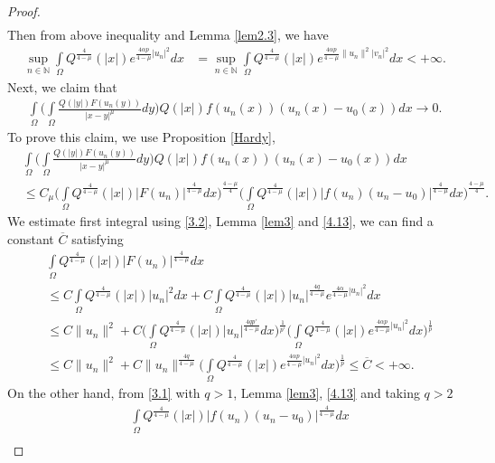 \documentclass[11pt]{amsart}
\numberwithin{equation}{section}
\newcommand{\1}{\frac{1}{2}}
\begin{document}
\begin{proof}
\begin{align}
		\end{align}
		Then from above inequality and Lemma \ref{lem2.3}, we have
		\begin{align}
			\label{4.13}
			\sup_{n \in \mathbb{N}} \int\limits_\Omega Q^{\frac{4}{4-\mu}}(|x|)e^{\frac{4\alpha p}{4-\mu}|u_n|^2}dx &= \sup_{n \in \mathbb{N}} \int\limits_\Omega Q^{\frac{4}{4-\mu}}(|x|)e^{\frac{4\alpha p}{4-\mu}\|u_n\|^2|v_n|^2}dx < +\infty. 
		\end{align}
		Next, we claim that 
		\begin{align}
			\label{4.14}\int\limits_\Omega \Bigg( \int\limits_\Omega \frac{Q(|y|)F(u_n(y))}{|x-y|^\mu}dy\Bigg) Q(|x|) f(u_n(x)) (u_n(x)-u_0(x))dx \to 0.
		\end{align}
		To prove this claim, we use Proposition \ref{Hardy}, 
		\begin{align}
			\label{4.15}
			&\int\limits_\Omega \Bigg( \int\limits_\Omega \frac{Q(|y|)F(u_n(y))}{|x-y|^\mu}dy\Bigg) Q(|x|) f(u_n(x)) (u_n(x)-u_0(x))dx \\
			&\leq C_\mu \Bigg(\int\limits_\Omega Q^{\frac{4}{4-\mu}}(|x|) |F(u_n)|^{\frac{4}{4-\mu}}dx\Bigg)^{\frac{4-\mu}{4}} \Bigg(\int\limits_\Omega Q^{\frac{4}{4-\mu}}(|x|) |f(u_n)(u_n-u_0)|^{\frac{4}{4-\mu}} dx\Bigg)^{\frac{4-\mu}{4}}.\nonumber
		\end{align}
		We estimate first integral using \eqref{3.2}, Lemma \ref{lem3} and \eqref{4.13}, we can find a constant $\overline{C}$ satisfying 
		\begin{align}
			&\int\limits_\Omega Q^{\frac{4}{4-\mu}}(|x|) |F(u_n)|^{\frac{4}{4-\mu}}dx \nonumber\\
			&\leq C \int\limits_\Omega Q^{\frac{4}{4-\mu}}(|x|) |u_n|^2 dx + C \int\limits_\Omega Q^{\frac{4}{4-\mu}}(|x|) |u_n|^{\frac{4q}{4-\mu}} e^{\frac{4\alpha}{4-\mu}|u_n|^2}dx\nonumber\\
			& \leq C\|u_n\|^2 +C \Bigg( \int\limits_\Omega Q^{\frac{4}{4-\mu}}(|x|) |u_n|^{\frac{4qp'}{4-\mu}} dx\Bigg)^{\frac{1}{p'}} \Bigg( \int\limits_\Omega Q^{\frac{4}{4-\mu}}(|x|) e^{\frac{4\alpha p}{4-\mu}|u_n|^2}dx\Bigg)^{\frac{1}{p}}\nonumber\\
			& \leq C\|u_n\|^2 +C \|u_n\|^{\frac{4q}{4-\mu}} \Bigg( \int\limits_\Omega Q^{\frac{4}{4-\mu}}(|x|) e^{\frac{4\alpha p}{4-\mu}|u_n|^2}dx\Bigg)^{\frac{1}{p}}\nonumber\leq \overline{C} <+\infty. \nonumber
		\end{align}
		On the other hand, from \eqref{3.1} with $q>1$, Lemma \ref{lem3}, \eqref{4.13} and taking $q>2$
		\begin{align}
			&\int\limits_\Omega Q^{\frac{4}{4-\mu}}(|x|) |f(u_n)(u_n-u_0)|^{\frac{4}{4-\mu}} dx\nonumber\\

\end{align}
\end{proof}
\end{document}
